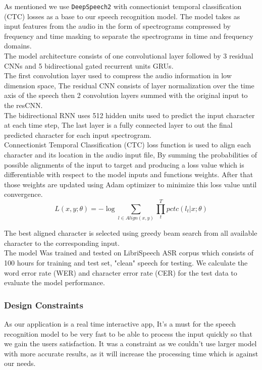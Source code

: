 As mentioned we use \texttt{DeepSpeech2} with connectionist temporal classification (CTC) losses as a base to our speech recognition model. The model takes as input features from the audio in the form of spectrograms compressed by frequency and time masking to separate the spectrograms in time and frequency domains. \\
The model architecture consists of one convolutional layer followed by 3 residual CNNs and 5 bidirectional gated recurrent units GRUs. \\

The first convolution layer used to compress the audio information in low dimension space, The residual CNN consists of layer normalization over the time axis of the speech then 2 convolution layers summed with the original input to the resCNN. \\

The bidirectional RNN uses 512 hidden units used to predict the input character at each time step, The last layer is a fully connected layer to out the final predicted character for each input spectrogram. \\

Connectionist Temporal Classification (CTC) loss function is used to align each character and its location in the audio input file, By summing the probabilities of possible alignments of the input to target and producing a loss value which is differentiable with respect to the model inputs and functions weights. After that those weights are updated using Adam optimizer to minimize this loss value until convergence. \\
\begin{equation}
    L(x,y;\theta) = - \log \sum_{l 	\in Align(x,y)}^{} \prod_{t}^{T} pctc (l_{t} |x;\theta )
\end{equation}

The best aligned character is selected using greedy beam search from all available character to the corresponding input. \\ 
The model Was trained and tested on LibriSpeech ASR corpus which consists of 100 hours for training and test set, "clean" speech for testing. We calculate the word error rate (WER) and character error rate (CER) for the test data to evaluate the model performance.


\subsubsection{Design Constraints}

As our application is a real time interactive app, It’s a must for the speech recognition model to be very fast to be able to process the input quickly so that we gain the users satisfaction. It was a constraint as we couldn't  use larger model with more accurate results, as it will increase the processing time which is against our needs.

